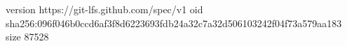 version https://git-lfs.github.com/spec/v1
oid sha256:096f046b0ccd6af3f8d6223693fdb24a32c7a32d506103242f04f73a579aa183
size 87528
